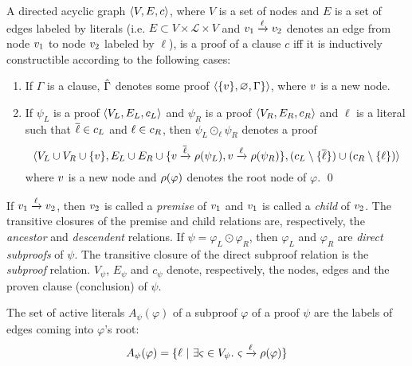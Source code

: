 \documentclass{llncs}
\begin{document}
\begin{definition}[Proof] 
\label{def:proof}
A directed acyclic graph $\langle V, E, c \rangle$, where $V$ is a set of
nodes and $E$ is a set of edges labeled by literals (i.e. $E \subset V \times
\mathcal{L} \times V$ and $v_1 \xrightarrow{\ell} v_2$ denotes an edge from
node $v_1$ to node $v_2$ labeled by $\ell$), is a proof of a clause $c$ iff
it is inductively constructible according to the following cases:
%
\begin{enumerate}
  \item If $\Gamma$ is a clause, $\hat{\Gamma}$ denotes some proof $\langle \{ v \}, \varnothing, \Gamma \} \rangle$, where $v$ is a new node.
  \item If $\psi_L$ is a proof $\langle V_L, E_L, c_L \rangle$ and
    $\psi_R$ is a proof $\langle V_R, E_R, c_R \rangle$ and $\ell$ is a literal such that
    $\overline{\ell} \in c_L$ and $\ell \in c_R$, then
    $\psi_L \odot_\ell \psi_R$ denotes a proof 
    $$\langle 
    V_L \cup V_R \cup \{v \},
    E_L \cup E_R \cup \{v \xrightarrow{\overline{\ell}} \rho(\psi_L), v \xrightarrow{\ell} \rho(\psi_R)\}, 
    (c_L \setminus \{ \overline{\ell} \}) \cup (c_R \setminus \{ \ell \})
    \rangle$$
     where $v$ is a new node and $\rho(\varphi)$ denotes the root node of $\varphi$.
  \qed
\end{enumerate}
\end{definition}


\newcommand{\Vertices}[1]{V_{#1}}
\newcommand{\Edges}[1]{E_{#1}}
\newcommand{\Conclusion}[1]{c_{#1}}

\noindent
If $v_1 \xrightarrow{\ell} v_2$, then $v_2$ is called a \emph{premise} of $v_1$ and $v_1$ is
called a \emph{child} of $v_2$. The transitive closures of the premise and child relations are,
respectively, the \emph{ancestor} and \emph{descendent} relations. If $\psi = \varphi_L \odot
\varphi_R$, then $\varphi_L$ and $\varphi_R$ are \emph{direct subproofs} of $\psi$. The transitive
closure of the direct subproof relation is the \emph{subproof} relation.
%
  $\Vertices{\psi}$, $\Edges{\psi}$ and $\Conclusion{\psi}$
denote, respectively, the nodes, edges and the proven clause (conclusion) of $\psi$.

\newcommand{\Active}[2]{A_{#2}(#1)}
\begin{definition}
The set of active literals $\Active{\varphi}{\psi}$ of a subproof $\varphi$ of a proof $\psi$
are the labels of edges coming into $\varphi$'s root: 
$$
\Active{\varphi}{\psi} =
  \{\ell \ | \ \exists \varsigma \in \Vertices{\psi}. \ \varsigma \xrightarrow{\ell} \raiz{\varphi} \}
$$
\end{definition}
\end{document}
